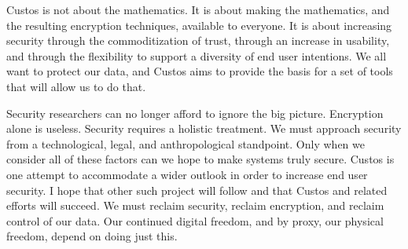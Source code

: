 Custos is not about the mathematics. It is about making the
mathematics, and the resulting encryption techniques, available to
everyone. It is about increasing security through the commoditization
of trust, through an increase in usability, and through the
flexibility to support a diversity of end user intentions. We all want
to protect our data, and Custos aims to provide the basis for a set of
tools that will allow us to do that.

Security researchers can no longer afford to ignore the big
picture. Encryption alone is useless. Security requires a holistic
treatment. We must approach security from a technological, legal, and
anthropological standpoint. Only when we consider all of these factors
can we hope to make systems truly secure. Custos is one attempt to
accommodate a wider outlook in order to increase end user security. I
hope that other such project will follow and that Custos and related
efforts will succeed. We must reclaim security, reclaim encryption,
and reclaim control of our data. Our continued digital freedom, and by
proxy, our physical freedom, depend on doing just this.

